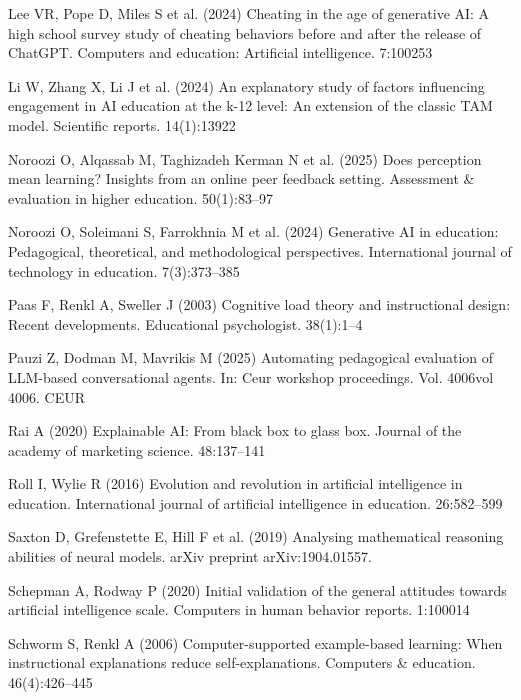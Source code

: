 \documentclass[
  12pt,
]{article}
\newlength{\cslhangindent}
\newenvironment{CSLReferences}[2] %
 {\begin{list}{}{%
  \setlength{\itemindent}{0pt}
  \setlength{\leftmargin}{0pt}
  \setlength{\parsep}{0pt}
  \ifodd #1
   \setlength{\leftmargin}{\cslhangindent}
   \setlength{\itemindent}{-1\cslhangindent}
  \fi
  \setlength{\itemsep}{#2\baselineskip}}}
 {\end{list}}
\begin{document}
\begin{CSLReferences}{1}{0}
Lee VR, Pope D, Miles S et al. (2024) Cheating in the age of generative AI: A high school survey study of cheating behaviors before and after the release of ChatGPT. Computers and education: Artificial intelligence. 7:100253

Li W, Zhang X, Li J et al. (2024) An explanatory study of factors influencing engagement in AI education at the k-12 level: An extension of the classic TAM model. Scientific reports. 14(1):13922

Noroozi O, Alqassab M, Taghizadeh Kerman N et al. (2025) Does perception mean learning? Insights from an online peer feedback setting. Assessment \& evaluation in higher education. 50(1):83--97

Noroozi O, Soleimani S, Farrokhnia M et al. (2024) Generative AI in education: Pedagogical, theoretical, and methodological perspectives. International journal of technology in education. 7(3):373--385

Paas F, Renkl A, Sweller J (2003) Cognitive load theory and instructional design: Recent developments. Educational psychologist. 38(1):1--4

Pauzi Z, Dodman M, Mavrikis M (2025) Automating pedagogical evaluation of LLM-based conversational agents. In: Ceur workshop proceedings. Vol. 4006vol 4006. CEUR

Rai A (2020) Explainable AI: From black box to glass box. Journal of the academy of marketing science. 48:137--141

Roll I, Wylie R (2016) Evolution and revolution in artificial intelligence in education. International journal of artificial intelligence in education. 26:582--599

Saxton D, Grefenstette E, Hill F et al. (2019) Analysing mathematical reasoning abilities of neural models. arXiv preprint arXiv:1904.01557.

Schepman A, Rodway P (2020) Initial validation of the general attitudes towards artificial intelligence scale. Computers in human behavior reports. 1:100014

Schworm S, Renkl A (2006) Computer-supported example-based learning: When instructional explanations reduce self-explanations. Computers \& education. 46(4):426--445


\end{CSLReferences}
\end{document}
